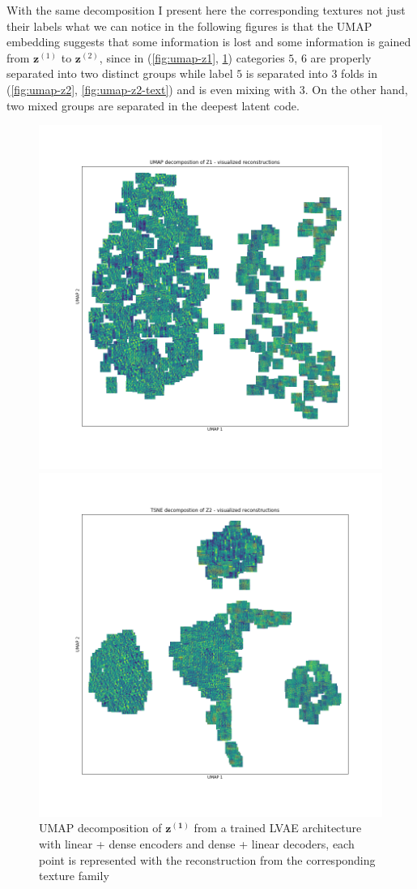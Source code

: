\documentclass[12pt, english]{article}
\begin{document}
\vspace{4mm}

\par With the same decomposition I present here the corresponding textures not just their labels what we can notice in the following figures is that the UMAP embedding suggests that some information is lost and some information is gained from $\bm{z}^{(1)}$ to $\bm{z}^{(2)}$, since in (\ref{fig:umap-z1}, \ref{fig:umap-z1-text}) categories $5$, $6$ are properly separated into two distinct groups while label $5$ is separated into 3 folds in (\ref{fig:umap-z2}, \ref{fig:umap-z2-text}) and is even mixing with $3$. On the other hand, two mixed groups are separated in the deepest latent code.

\vspace{4mm}

\begin{figure}[H] 
  \begin{minipage}{0.48\linewidth}
    \centering
    \includegraphics[width=.7\linewidth]{umap_z1_dense_lin_lin_no_norm_textures.png}
    \caption{UMAP decomposition of $\bm{z^{(1)}}$ from a trained LVAE architecture with linear + dense encoders and dense + linear decoders, each point is represented with the reconstruction from the corresponding texture family}
    \label{fig:umap-z1-text}
  \end{minipage}\hfill
  \begin{minipage}{0.48\linewidth}
    \centering
    \includegraphics[width=.7\linewidth]{umap_z2_dense_lin_lin_no_norm_textures.png} 

\end{minipage}
\end{figure}
\end{document}
